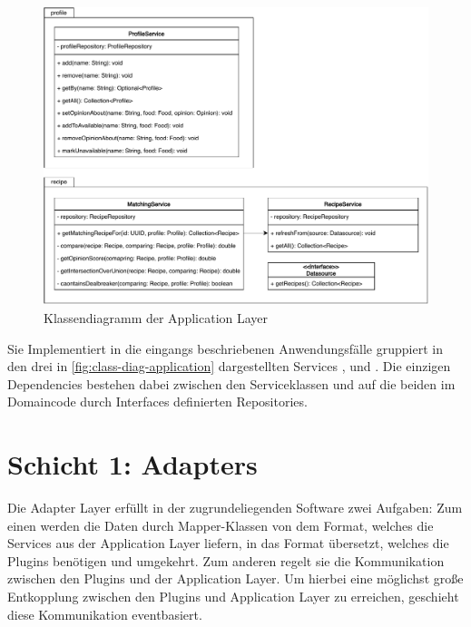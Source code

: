\begin{figure}[ht!]
    \includegraphics[width=0.98\columnwidth]{../diagrams/application_uml.pdf}
    \caption{Klassendiagramm der Application Layer}
    \label{fig:class-diag-application}
\end{figure}

Sie Implementiert in die eingangs beschriebenen Anwendungsfälle gruppiert in den drei in \autoref{fig:class-diag-application} dargestellten Services ,  und . Die einzigen Dependencies bestehen dabei zwischen den Serviceklassen und auf die beiden im Domaincode durch Interfaces definierten Repositories.

\section{Schicht 1: Adapters}
Die Adapter Layer erfüllt in der zugrundeliegenden Software zwei Aufgaben: Zum einen werden die Daten durch Mapper-Klassen von dem Format, welches die Services aus der Application Layer liefern, in das Format übersetzt, welches die Plugins benötigen und umgekehrt. Zum anderen regelt sie die Kommunikation zwischen den Plugins und der Application Layer. Um hierbei eine möglichst große Entkopplung zwischen den Plugins und Application Layer zu erreichen, geschieht diese Kommunikation eventbasiert.

